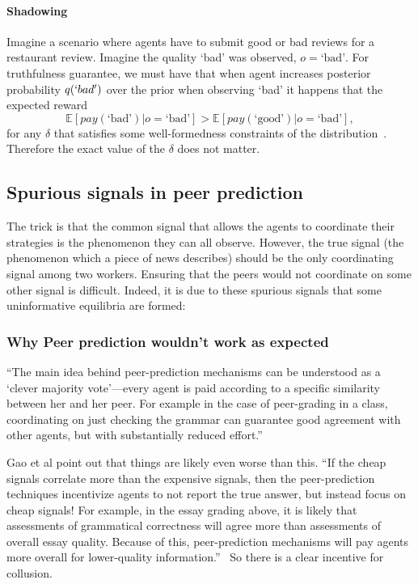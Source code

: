 \documentclass{report}
\theoremstyle{definition}
\begin{document}
\paragraph{Shadowing} Imagine a scenario where agents have to submit good or bad reviews for a restaurant review. Imagine the quality `bad' was observed, $o = \text{`bad'}$. For truthfulness guarantee, we must have that when agent increases posterior probability $q(`bad')$ over the prior when observing `bad' it happens that the expected reward 
\begin{equation}
    \mathds{E}[pay(\text{`bad'}) | o = \text{`bad'}] > 
    \mathds{E}[pay(\text{`good'}) | o = \text{`bad'}],
\end{equation}
for any $\delta$ that satisfies some well-formedness constraints of the distribution~\cite{faltings:book}. Therefore the exact value of the $\delta$ does not matter. 

\subsection{Spurious signals in peer prediction}

The trick is that the common signal that allows the agents to coordinate their strategies is the phenomenon they can all observe.\cite{faltings:book} However, the true signal (the phenomenon which a piece of news describes) should be the only coordinating signal among two workers. Ensuring that the peers would not coordinate on some other signal is difficult. Indeed, it is due to these spurious signals that some uninformative equilibria are formed:

\subsubsection{Why Peer prediction wouldn't work as expected}

``The main idea behind peer-prediction mechanisms can be understood as a `clever majority vote'—every agent is paid according to a specific similarity between her and her peer. For example in the case of peer-grading in a class, coordinating on just checking the grammar can guarantee good agreement with other agents, but with substantially reduced effort.''~\cite{kong:noverify}
    
Gao et al point out that things are likely even worse than this. ``If the cheap signals correlate more than the expensive signals, then the peer-prediction techniques incentivize agents to not report the true answer, but instead focus on cheap signals! For example, in the essay grading above, it is likely that assessments of grammatical correctness will agree more than assessments of overall essay quality. Because of this, peer-prediction mechanisms will pay agents more overall for lower-quality information.''~\cite{kong:noverify} So there is a clear incentive for collusion. 
    
\end{document}

